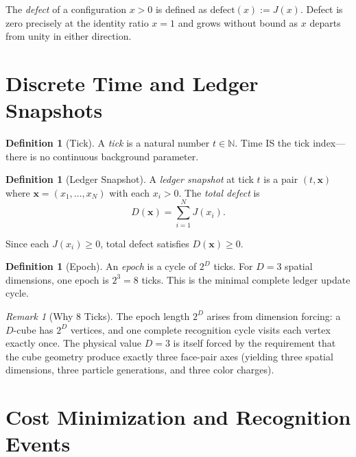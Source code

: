 \documentclass[12pt,a4paper]{article}
\theoremstyle{definition}
\newtheorem{definition}[theorem]{Definition}
\theoremstyle{remark}
\newtheorem{remark}[theorem]{Remark}
\begin{document}
The \emph{defect} of a configuration $x > 0$ is defined as
$\mathrm{defect}(x) := J(x)$.  Defect is zero precisely at the identity
ratio $x = 1$ and grows without bound as $x$ departs from unity in
either direction.

\section{Discrete Time and Ledger Snapshots}
\label{sec:time}

\begin{definition}[Tick]
\label{def:tick}
A \emph{tick} is a natural number $t \in \mathbb{N}$.  Time IS the tick
index---there is no continuous background parameter.
\end{definition}

\begin{definition}[Ledger Snapshot]
\label{def:snapshot}
A \emph{ledger snapshot} at tick $t$ is a pair $(t, \mathbf{x})$ where
$\mathbf{x} = (x_1, \ldots, x_N)$ with each $x_i > 0$.  The
\emph{total defect} is
\begin{equation}
  D(\mathbf{x}) = \sum_{i=1}^{N} J(x_i).
\end{equation}
\end{definition}

Since each $J(x_i) \geq 0$, total defect satisfies $D(\mathbf{x}) \geq 0$.

\begin{definition}[Epoch]
\label{def:epoch}
An \emph{epoch} is a cycle of $2^D$ ticks.  For $D = 3$ spatial
dimensions, one epoch is $2^3 = 8$ ticks.  This is the minimal complete
ledger update cycle.
\end{definition}

\begin{remark}[Why 8 Ticks]
The epoch length $2^D$ arises from dimension forcing: a $D$-cube has
$2^D$ vertices, and one complete recognition cycle visits each vertex
exactly once.  The physical value $D = 3$ is itself forced by the
requirement that the cube geometry produce exactly three face-pair axes
(yielding three spatial dimensions, three particle generations, and
three color charges).
\end{remark}

\section{Cost Minimization and Recognition Events}
\label{sec:cost-min}
\end{document}
